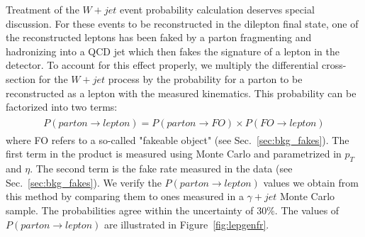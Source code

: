 Treatment of the $W+jet$ event probability calculation deserves special discussion.
For these events to be reconstructed in the dilepton final state,
one of the reconstructed leptons has been faked by a parton fragmenting and hadronizing 
into a QCD jet which then fakes the signature of a lepton in the detector. To account for this 
effect properly, we multiply the differential cross-section for the $W+jet$ process by the 
probability for a parton to be reconstructed as a lepton with the measured kinematics. 
This probability can be factorized into two terms:
\begin{eqnarray}
\begin{array}{lcl}
P(parton\rightarrow lepton)=P(parton\rightarrow FO)\times P(FO\rightarrow lepton)
\end{array} 
\end{eqnarray} 
where FO refers to a so-called "fakeable object" (see Sec.~\ref{sec:bkg_fakes}). 
The first term in the product is measured using Monte Carlo and parametrized
in $p_{T}$ and $\eta$.  The second term is the fake rate measured in the data 
(see Sec.~\ref{sec:bkg_fakes}).
We verify the $P(parton\rightarrow lepton)$ values we obtain from this method by comparing them to ones measured in a $\gamma+jet$ Monte Carlo sample.  The probabilities agree within the uncertainty of $30\%$.  The values of $P(parton\rightarrow lepton)$ are illustrated in Figure~\ref{fig:lepgenfr}.

